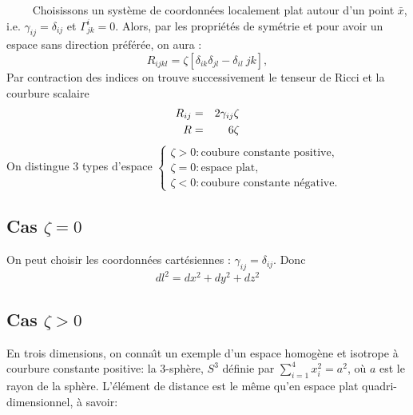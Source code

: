 \documentclass[a4paper,12pt]{report}
\theoremstyle{plain}
\theoremstyle{plain}
\begin{document}
 $\qquad$ Choisissons un syst\`eme de coordonn\'ees localement plat autour d'un point $\bar{x}$, i.e. $\gamma	_{ij}=\delta_{ij}$ et $\Gamma_{jk}^i = 0$. Alors, par les propri\'et\'es de sym\'etrie et pour avoir un espace sans direction pr\'ef\'er\'ee, on aura :
 \begin{equation}
 R_{ijkl}=\zeta \left[ \delta_{ik} \delta_{jl} - \delta_{il} \ {jk}\right],
 \end{equation} 
 Par contraction des indices on trouve successivement le tenseur de Ricci et la courbure scalaire 
 \begin{eqnarray}
 R_{ij}&=&2\gamma_{ij} \zeta \cr
 R&=&6\zeta
 \end{eqnarray}
 On distingue 3 types d'espace 
 $	\begin{cases}
 \zeta >0 :\text{coubure constante positive},\\
 \zeta =0 : \text{espace plat}, \\
 \zeta <0 : \text{coubure constante n\'egative}.
 \end{cases}$ 
  \subsection*{Cas $\zeta =0$} 
  On peut  choisir les coordonn\'ees cart\'esiennes : $\gamma_{ij}= \delta_{ij}$. Donc 
  \begin{equation}
  dl^2=dx^2+dy^2+dz^2
  \end{equation}
  \subsection*{Cas $\zeta>0$} 
  En trois dimensions, on conna\^{\i}t un exemple d'un  espace homog\`ene et isotrope \`a courbure constante positive: la $3$-sph\`ere, $S^3$ d\'efinie par $ \sum_{i=1}^{4}x_i^2=a^2$, o\`{u} $a$ est le rayon de la sph\`ere. L'\'el\'ement de distance est le m\^eme qu'en espace plat quadri-dimensionnel, \`a savoir:
  
\end{document}
